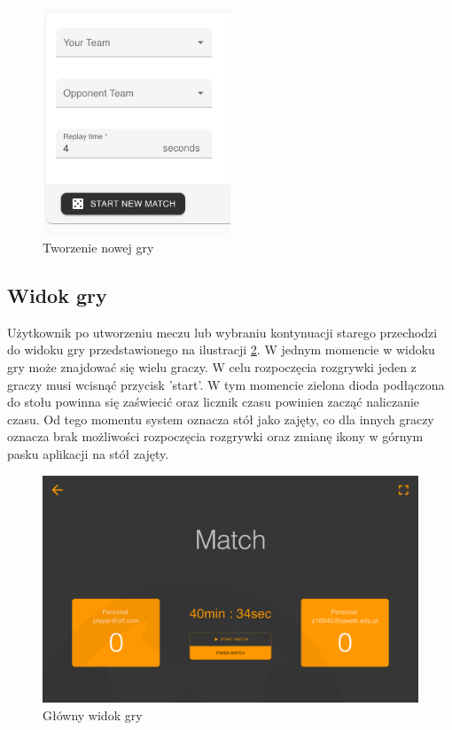 \begin{figure}[h!]
  \centering
    \includegraphics[width=0.5\textwidth]{images/player/create-match.png}
  \caption{Tworzenie nowej gry}
  \label{fig:create-match}
\end{figure}

\subsection{Widok gry}

Użytkownik po utworzeniu meczu lub wybraniu kontynuacji starego przechodzi do widoku gry przedstawionego na ilustracji \ref{fig:match}. W jednym momencie w widoku gry może znajdować się wielu graczy. W celu rozpoczęcia rozgrywki jeden z graczy musi wcisnąć przycisk 'start'. W tym momencie zielona dioda podłączona do stołu powinna się zaświecić oraz licznik czasu powinien zacząć naliczanie czasu. Od tego momentu system oznacza stół jako zajęty, co dla innych graczy oznacza brak możliwości rozpoczęcia rozgrywki oraz zmianę ikony w górnym pasku aplikacji na stół zajęty.

\begin{figure}[h!]
  \centering
    \includegraphics[width=\textwidth]{images/player/match.png}
  \caption{Główny widok gry}
  \label{fig:match}
\end{figure}

